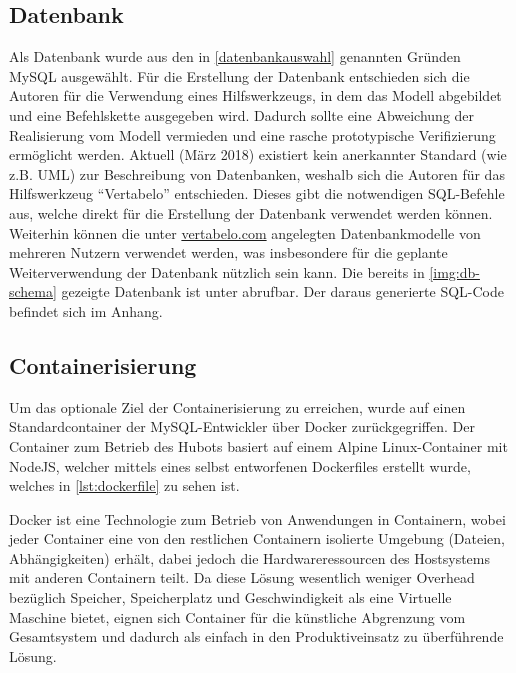 \subsection{Datenbank}

Als Datenbank wurde aus den in \autoref{datenbankauswahl} genannten Gründen MySQL ausgewählt.
Für die Erstellung der Datenbank entschieden sich die Autoren für die Verwendung eines Hilfswerkzeugs, in dem das Modell abgebildet und eine Befehlskette ausgegeben wird. Dadurch sollte eine Abweichung der Realisierung vom Modell vermieden und eine rasche prototypische Verifizierung ermöglicht werden. Aktuell (März 2018) existiert kein anerkannter Standard (wie z.B. UML) zur Beschreibung von Datenbanken, weshalb sich die Autoren für das Hilfswerkzeug \enquote{Vertabelo} entschieden. Dieses gibt die notwendigen SQL-Befehle aus, welche direkt für die Erstellung der Datenbank verwendet werden können. Weiterhin können die unter \url{vertabelo.com} angelegten Datenbankmodelle von mehreren Nutzern verwendet werden, was insbesondere für die geplante Weiterverwendung der Datenbank nützlich sein kann.
Die bereits in \autoref{img:db-schema} gezeigte Datenbank ist unter \cite{VertabeloDesignYourDatabase2018} abrufbar. Der daraus generierte SQL-Code befindet sich im Anhang.


\subsection{Containerisierung}

Um das optionale Ziel der Containerisierung zu erreichen, wurde auf einen Standardcontainer der MySQL-Entwickler über Docker zurückgegriffen. Der Container zum Betrieb des Hubots basiert auf einem Alpine Linux-Container mit NodeJS, welcher mittels eines selbst entworfenen Dockerfiles erstellt wurde, welches in \autoref{lst:dockerfile} zu sehen ist.


Docker ist eine Technologie zum Betrieb von Anwendungen in Containern, wobei jeder Container eine von den restlichen Containern isolierte Umgebung (Dateien, Abhängigkeiten) erhält, dabei jedoch die Hardwareressourcen des Hostsystems mit anderen Containern teilt. Da diese Lösung wesentlich weniger Overhead bezüglich Speicher, Speicherplatz und Geschwindigkeit als eine Virtuelle Maschine bietet, eignen sich Container für die künstliche Abgrenzung vom Gesamtsystem und dadurch als einfach in den Produktiveinsatz zu überführende Lösung.

